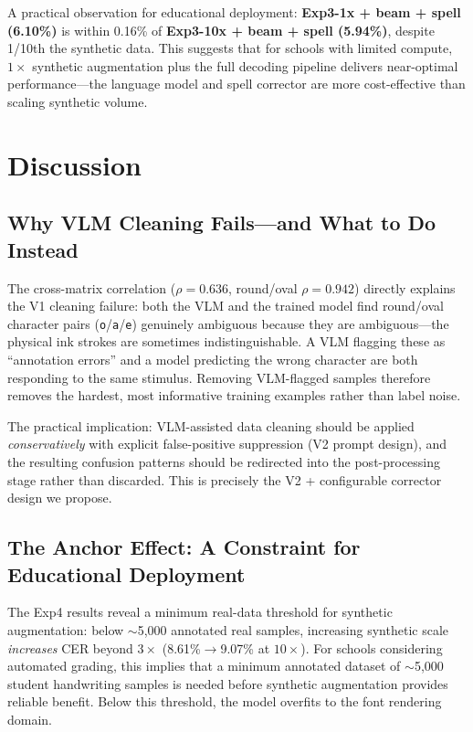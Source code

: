 \documentclass[conference]{IEEEtran}
\begin{document}
A practical observation for educational deployment: \textbf{Exp3-1x + beam + spell (6.10\%)} is within 0.16\% of \textbf{Exp3-10x + beam + spell (5.94\%)}, despite 1/10th the synthetic data. This suggests that for schools with limited compute, $1\times$ synthetic augmentation plus the full decoding pipeline delivers near-optimal performance---the language model and spell corrector are more cost-effective than scaling synthetic volume.

\section{Discussion}

\subsection{Why VLM Cleaning Fails---and What to Do Instead}

The cross-matrix correlation ($\rho=0.636$, round/oval $\rho=0.942$) directly explains the V1 cleaning failure: both the VLM and the trained model find round/oval character pairs (\texttt{o}/\texttt{a}/\texttt{e}) genuinely ambiguous because they are ambiguous---the physical ink strokes are sometimes indistinguishable. A VLM flagging these as ``annotation errors'' and a model predicting the wrong character are both responding to the same stimulus. Removing VLM-flagged samples therefore removes the hardest, most informative training examples rather than label noise.

The practical implication: VLM-assisted data cleaning should be applied \emph{conservatively} with explicit false-positive suppression (V2 prompt design), and the resulting confusion patterns should be redirected into the post-processing stage rather than discarded. This is precisely the V2 + configurable corrector design we propose.

\subsection{The Anchor Effect: A Constraint for Educational Deployment}

The Exp4 results reveal a minimum real-data threshold for synthetic augmentation: below $\sim$5,000 annotated real samples, increasing synthetic scale \emph{increases} CER beyond $3\times$ (8.61\%$\to$9.07\% at $10\times$). For schools considering automated grading, this implies that a minimum annotated dataset of $\sim$5,000 student handwriting samples is needed before synthetic augmentation provides reliable benefit. Below this threshold, the model overfits to the font rendering domain.
\end{document}
